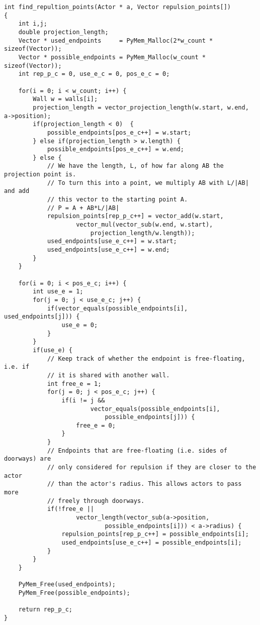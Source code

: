 \begin{lstlisting}[caption={Code for finding the wall repulsion 
    points.},label=lst:repulsion-points]
int find_repultion_points(Actor * a, Vector repulsion_points[])
{
    int i,j;
    double projection_length;
    Vector * used_endpoints     = PyMem_Malloc(2*w_count * sizeof(Vector));
    Vector * possible_endpoints = PyMem_Malloc(w_count * sizeof(Vector));
    int rep_p_c = 0, use_e_c = 0, pos_e_c = 0;

    for(i = 0; i < w_count; i++) {
        Wall w = walls[i];
        projection_length = vector_projection_length(w.start, w.end, a->position);
        if(projection_length < 0)  {
            possible_endpoints[pos_e_c++] = w.start;
        } else if(projection_length > w.length) {
            possible_endpoints[pos_e_c++] = w.end;
        } else {
            // We have the length, L, of how far along AB the projection point is.
            // To turn this into a point, we multiply AB with L/|AB| and add
            // this vector to the starting point A.
			// P = A + AB*L/|AB|
            repulsion_points[rep_p_c++] = vector_add(w.start, 
                    vector_mul(vector_sub(w.end, w.start), 
                        projection_length/w.length));
            used_endpoints[use_e_c++] = w.start;
            used_endpoints[use_e_c++] = w.end;
        }
    }

    for(i = 0; i < pos_e_c; i++) {
        int use_e = 1;
        for(j = 0; j < use_e_c; j++) {
            if(vector_equals(possible_endpoints[i], used_endpoints[j])) {
                use_e = 0;
            }
        }
        if(use_e) {
			// Keep track of whether the endpoint is free-floating, i.e. if
			// it is shared with another wall.
			int free_e = 1;
			for(j = 0; j < pos_e_c; j++) {
				if(i != j && 
						vector_equals(possible_endpoints[i],
							possible_endpoints[j])) {
					free_e = 0;
				}
			}
			// Endpoints that are free-floating (i.e. sides of doorways) are
			// only considered for repulsion if they are closer to the actor
			// than the actor's radius. This allows actors to pass more
			// freely through doorways.
			if(!free_e || 
					vector_length(vector_sub(a->position,
							possible_endpoints[i])) < a->radius) {
				repulsion_points[rep_p_c++] = possible_endpoints[i];
				used_endpoints[use_e_c++] = possible_endpoints[i];
			}
        }
    }

    PyMem_Free(used_endpoints);
    PyMem_Free(possible_endpoints);

    return rep_p_c;
}
\end{lstlisting}

